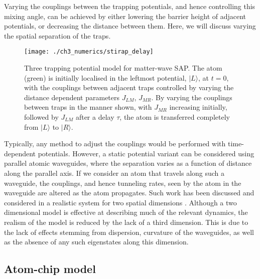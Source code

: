Varying the couplings between the trapping potentials, and hence controlling this mixing angle, can be achieved by either lowering the barrier height of adjacent potentials, or decreasing the distance between them. Here, we will discuss varying the spatial separation of the traps.

\begin{figure}
    \centering
    \texttt{[image: ./ch3\_numerics/stirap\_delay]}
    \caption{Three trapping potential model for matter-wave SAP. The atom (green) is initially localised in the leftmost potential, $|L\rangle$, at $t=0$, with the couplings between adjacent traps controlled by varying the distance dependent parameters $J_{LM}$, $J_{MR}$. By varying the couplings between traps in the manner shown, with $J_{MR}$ increasing initially, followed by $J_{LM}$ after a delay $\tau$, the atom is transferred completely from $|L\rangle$ to $| R \rangle$.}
    \label{fig:ch3_stirap}
\end{figure}

Typically, any method to adjust the couplings would be performed with time-dependent potentials. However, a static potential variant can be considered using parallel atomic waveguides, where the separation varies as a function of distance along the parallel axis. If we consider an atom that travels along such a waveguide, the couplings, and hence tunneling rates, seen by the atom in the waveguide are altered as the atom propagates. Such work has been discussed and considered in a realistic system for two spatial dimensions \cite{OSullivan:10}. Although a two dimensional model is effective at describing much of the relevant dynamics, the realism of the model is reduced by the lack of a third dimension. This is due to the lack of effects stemming from dispersion, curvature of the waveguides, as well as the absence of any such eigenstates along this dimension.

\subsection{Atom-chip model}

